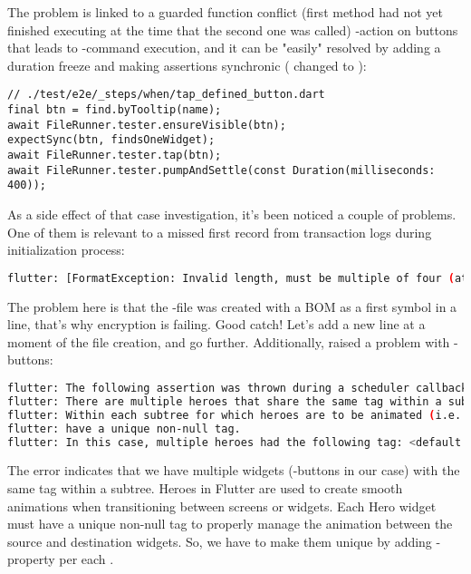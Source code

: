 \noindent The problem is linked to a guarded function conflict (first method had not yet finished executing at the time 
that the second one was called) -action on buttons that leads to -command 
execution, and it can be "easily" resolved by adding a duration freeze and making assertions synchronic ( 
changed to ):

\begin{lstlisting}
// ./test/e2e/_steps/when/tap_defined_button.dart
final btn = find.byTooltip(name);
await FileRunner.tester.ensureVisible(btn);
expectSync(btn, findsOneWidget);
await FileRunner.tester.tap(btn);
await FileRunner.tester.pumpAndSettle(const Duration(milliseconds: 400));
\end{lstlisting}

\noindent As a side effect of that case investigation, it's been noticed a couple of problems. One of them is relevant
to a missed first record from transaction logs during initialization process:

\begin{lstlisting}[language=bash]
flutter: [FormatException: Invalid length, must be multiple of four (at character 84)
\end{lstlisting}

The problem here is that the -file was created with a BOM as a first symbol in a line, that's why 
encryption is failing. Good catch! Let's add a new line at a moment of the file creation, and go further. Additionally,
raised a problem with -buttons:

\begin{lstlisting}[language=bash]
flutter: The following assertion was thrown during a scheduler callback:
flutter: There are multiple heroes that share the same tag within a subtree.
flutter: Within each subtree for which heroes are to be animated (i.e. a PageRoute subtree), each Hero must
flutter: have a unique non-null tag.
flutter: In this case, multiple heroes had the following tag: <default FloatingActionButton tag>
\end{lstlisting}

The error indicates that we have multiple  widgets (-buttons in our case) with the 
same tag within a subtree. Heroes in Flutter are used to create smooth animations when transitioning between screens or 
widgets. Each Hero widget must have a unique non-null tag to properly manage the animation between the source 
and destination widgets. So, we have to make them unique by adding -property per each .

